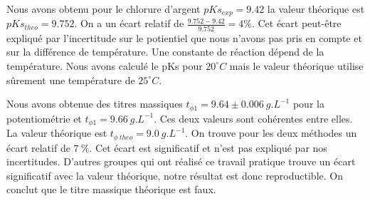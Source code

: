 \documentclass[12pt]{article}
\begin{document}
Nous avons obtenu pour le chlorure d'argent $pKs_{exp}=9.42$ la valeur théorique est $pKs_{theo}=9.752$. 
On a un écart relatif de $\frac{9.752-9.42}{9.752}= 4 \%$. 
Cet écart peut-être expliqué par l'incertitude sur le potientiel que nous n'avons pas pris en compte et sur la différence de température.
Une constante de réaction dépend de la température. 
Nous avons calculé le pKs pour $20^\circ C$ mais le valeur théorique utilise sûrement une température de $25^\circ C$.

Nous avons obtenue des titres massiques $t_{\phi 1}= 9.64 \pm 0.006 \ g.L^{-1}$ pour la potentiométrie et $t_{\phi 1}= 9.66 \ g.L^{-1}$.
Ces deux valeurs sont cohérentes entre elles. 
La valeur théorique est $t_{\phi \ theo}= 9.0 \ g.L^{-1}$.
On trouve pour les deux méthodes un écart relatif de $7\ \%$.
Cet écart est significatif et n'est pas expliqué par nos incertitudes.
D'autres groupes qui ont réalisé ce travail pratique trouve un écart significatif avec la valeur théorique, notre résultat est donc reproductible.
On conclut que le titre massique théorique est faux. 
\end{document}
